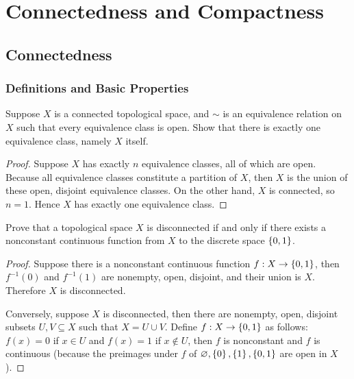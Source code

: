 \chapter{Connectedness and Compactness}

\section*{Connectedness}

\subsection*{Definitions and Basic Properties}

\begin{exercise}{4.3}
	Suppose $X$ is a connected topological space, and $\sim$ is an equivalence relation on $X$ such that every equivalence class is open. Show that there is exactly one equivalence class, namely $X$ itself.
\end{exercise}

\begin{proof}
	Suppose $X$ has exactly $n$ equivalence classes, all of which are open. Because all equivalence classes constitute a partition of $X$, then $X$ is the union of these open, disjoint equivalence classes. On the other hand, $X$ is connected, so $n = 1$. Hence $X$ has exactly one equivalence class.
\end{proof}

\begin{exercise}{4.4}
	Prove that a topological space $X$ is disconnected if and only if there exists a nonconstant continuous function from $X$ to the discrete space $\left\{{0,1}\right\}$.
\end{exercise}

\begin{proof}
	Suppose there is a nonconstant continuous function $f: X\to \left\{{0,1}\right\}$, then $f^{-1}(0)$ and $f^{-1}(1)$ are nonempty, open, disjoint, and their union is $X$. Therefore $X$ is disconnected.

	Conversely, suppose $X$ is disconnected, then there are nonempty, open, disjoint subsets $U, V\subseteq X$ such that $X = U\cup V$. Define $f: X\to \left\{{0,1}\right\}$ as follows: $f(x) = 0$ if $x\in U$ and $f(x) = 1$ if $x\notin U$, then $f$ is nonconstant and $f$ is continuous (because the preimages under $f$ of $\varnothing, \left\{{0}\right\}, \left\{{1}\right\}, \left\{{0, 1}\right\}$ are open in $X$).
\end{proof}

